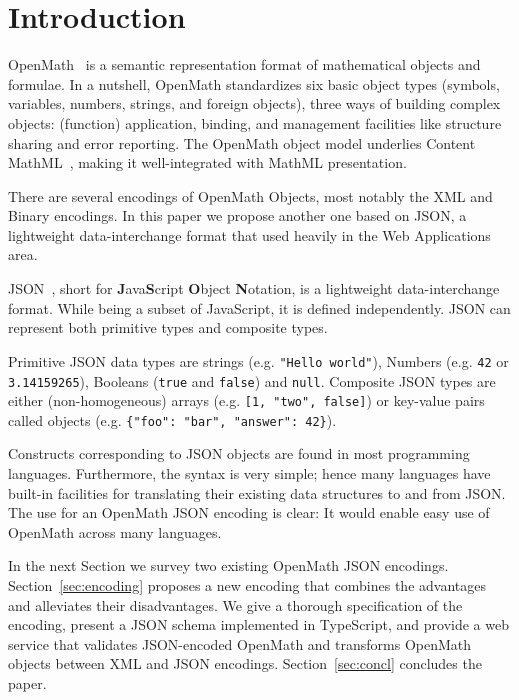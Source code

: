 \section{Introduction}

OpenMath~\cite {BusCapCar:oms04} is a semantic representation format of mathematical objects and formulae. 
In a nutshell, OpenMath standardizes six basic object types (symbols, variables, numbers, strings, and foreign objects), three ways of building complex objects: (function) application, binding, and management facilities like structure sharing and error reporting. 
The OpenMath object model underlies Content MathML~\cite{CarlisleEd:MathML3:on}, making it well-integrated with MathML presentation. 

There are several encodings of OpenMath Objects, most notably the XML and Binary encodings. 
In this paper we propose another one based on JSON, a lightweight data-interchange format that used heavily in the Web Applications area.

JSON~\cite{JSON:web}, short for \textbf{J}ava\textbf{S}cript \textbf{O}bject \textbf{N}otation, is a lightweight data-interchange format.
While being a subset of JavaScript, it is defined independently. 
JSON can represent both primitive types and composite types.

Primitive JSON data types are strings (e.g. \lstinline{"Hello world"}), Numbers (e.g. \lstinline{42} or \lstinline{3.14159265}), Booleans (\lstinline{true} and \lstinline{false}) and \lstinline{null}. 
Composite JSON types are either (non-homogeneous) arrays (e.g. \lstinline{[1, "two", false]}) or key-value pairs called objects (e.g. \lstinline|{"foo": "bar", "answer": 42}|).

Constructs corresponding to JSON objects are found in most programming languages. 
Furthermore, the syntax is very simple; hence many languages have built-in facilities for translating their existing data structures to and from JSON. 
The use for an OpenMath JSON encoding is clear: It would enable easy use of OpenMath across many languages.

In the next Section we survey two existing OpenMath JSON encodings. 
Section~\ref{sec:encoding} proposes a new encoding that combines the advantages and alleviates their disadvantages. 
We give a thorough specification of the encoding, present a JSON schema implemented in TypeScript, and provide a web service that validates JSON-encoded OpenMath and transforms OpenMath objects between XML and JSON encodings. 
Section~\ref{sec:concl} concludes the paper.


